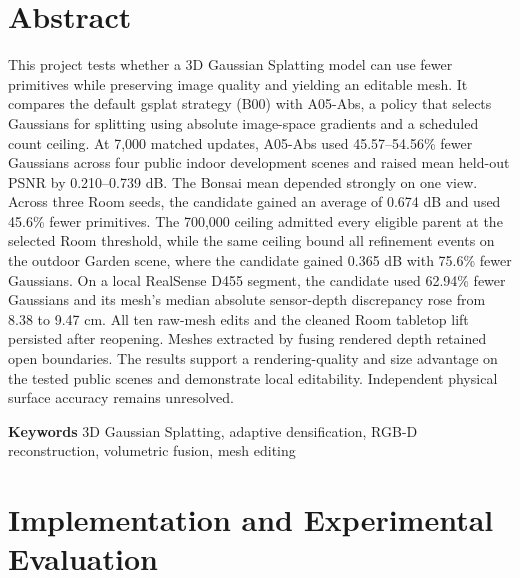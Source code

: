 \documentclass[11pt,a4paper]{article}
\begin{document}
\section*{Abstract}
This project tests whether a 3D Gaussian Splatting model can use fewer primitives while preserving image quality and yielding an editable mesh. It compares the default gsplat strategy (B00) with A05-Abs, a policy that selects Gaussians for splitting using absolute image-space gradients and a scheduled count ceiling. At 7,000 matched updates, A05-Abs used 45.57--54.56\% fewer Gaussians across four public indoor development scenes and raised mean held-out PSNR by 0.210--0.739 dB. The Bonsai mean depended strongly on one view. Across three Room seeds, the candidate gained an average of 0.674 dB and used 45.6\% fewer primitives. The 700,000 ceiling admitted every eligible parent at the selected Room threshold, while the same ceiling bound all refinement events on the outdoor Garden scene, where the candidate gained 0.365 dB with 75.6\% fewer Gaussians. On a local RealSense D455 segment, the candidate used 62.94\% fewer Gaussians and its mesh's median absolute sensor-depth discrepancy rose from 8.38 to 9.47 cm. All ten raw-mesh edits and the cleaned Room tabletop lift persisted after reopening. Meshes extracted by fusing rendered depth retained open boundaries. The results support a rendering-quality and size advantage on the tested public scenes and demonstrate local editability. Independent physical surface accuracy remains unresolved.\par
\textbf{Keywords} 3D Gaussian Splatting, adaptive densification, RGB-D reconstruction, volumetric fusion, mesh editing\par
\clearpage
\begingroup\fontsize{9.5}{11}\selectfont\setlength{\parskip}{0pt}\tableofcontents\endgroup
\clearpage
{}
\listoffigures
\clearpage
{}
\listoftables
\clearpage

\clearpage

\clearpage

\clearpage
\section{Implementation and Experimental Evaluation}
\end{document}
